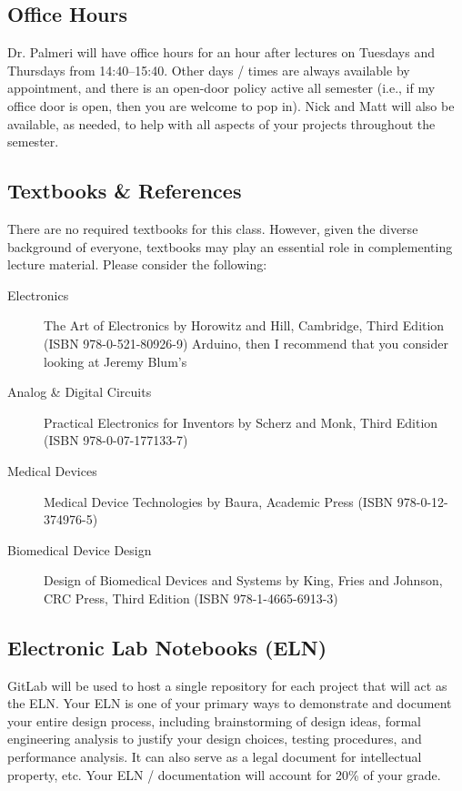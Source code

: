 \subsection*{Office Hours}
Dr. Palmeri will have office hours for an hour after lectures on Tuesdays and
Thursdays from 14:40--15:40.  Other days / times are always available by
appointment, and there is an open-door policy active all semester (i.e., if my
office door is open, then you are welcome to pop in).  Nick and Matt will also
be available, as needed, to help with all aspects of your projects throughout
the semester.

\subsection*{Textbooks \& References} 
There are no required textbooks for this class.  However, given the diverse background of everyone, textbooks may play an essential role in complementing lecture material.  Please consider the following:

\begin{description}
    \item[Electronics] The Art of Electronics by Horowitz and Hill, Cambridge,
        Third Edition (ISBN 978-0-521-80926-9) Arduino, then I recommend that
        you consider looking at Jeremy Blum's
    \item[Analog \& Digital Circuits] Practical Electronics for Inventors by
        Scherz and Monk, Third Edition (ISBN 978-0-07-177133-7)
    \item[Medical Devices] Medical Device Technologies by Baura, Academic Press
        (ISBN 978-0-12-374976-5)
    \item[Biomedical Device Design] Design of Biomedical Devices and Systems by
        King, Fries and Johnson, CRC Press, Third Edition (ISBN
        978-1-4665-6913-3)
\end{description}

\subsection*{Electronic Lab Notebooks (ELN)} 
GitLab will be used to host a single repository for each project that will act
as the ELN.  Your ELN is one of your primary ways to demonstrate and document
your entire design process, including brainstorming of design ideas, formal
engineering analysis to justify your design choices, testing procedures, and
performance analysis.  It can also serve as a legal document for intellectual
property, etc.  Your ELN / documentation will account for 20\% of your grade.

